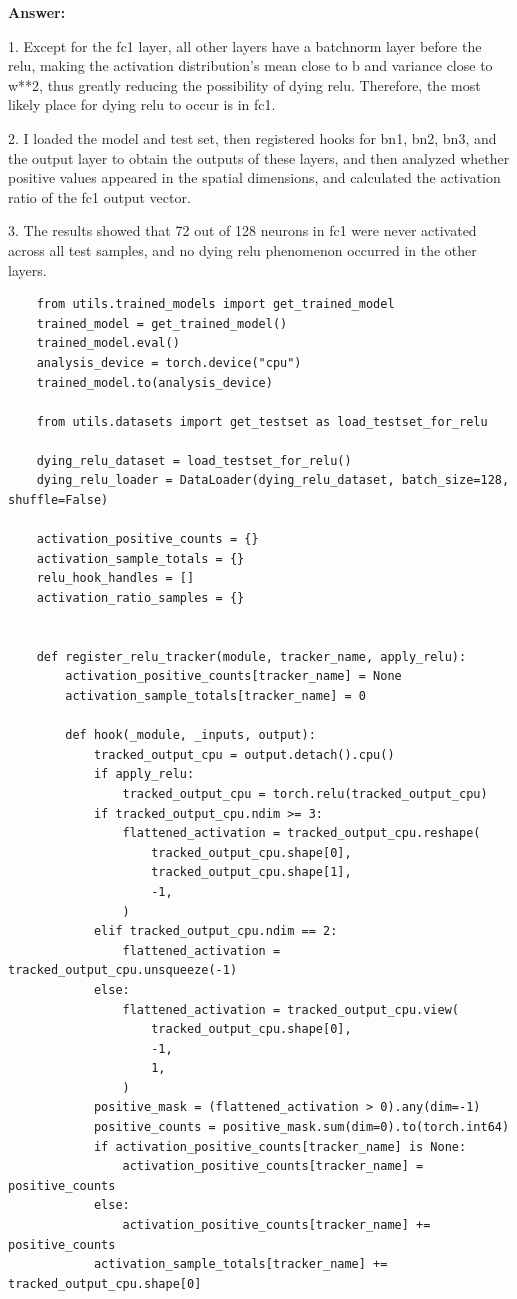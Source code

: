 \documentclass[11pt, oneside]{article}   	%
\begin{document}
\begin{answerbox} \textbf{Answer:} \vspace*{1cm}

1. Except for the fc1 layer, all other layers have a batchnorm layer before the relu, making the activation distribution's mean close to b and variance close to w**2, thus greatly reducing the possibility of dying relu. Therefore, the most likely place for dying relu to occur is in fc1.

2. I loaded the model and test set, then registered hooks for bn1, bn2, bn3, and the output layer to obtain the outputs of these layers, and then analyzed whether positive values appeared in the spatial dimensions, and calculated the activation ratio of the fc1 output vector.

3. The results showed that 72 out of 128 neurons in fc1 were never activated across all test samples, and no dying relu phenomenon occurred in the other layers.

\begin{verbatim}
    from utils.trained_models import get_trained_model
    trained_model = get_trained_model()
    trained_model.eval()
    analysis_device = torch.device("cpu")
    trained_model.to(analysis_device)
    
    from utils.datasets import get_testset as load_testset_for_relu
    
    dying_relu_dataset = load_testset_for_relu()
    dying_relu_loader = DataLoader(dying_relu_dataset, batch_size=128, shuffle=False)
    
    activation_positive_counts = {}
    activation_sample_totals = {}
    relu_hook_handles = []
    activation_ratio_samples = {}
    
    
    def register_relu_tracker(module, tracker_name, apply_relu):
        activation_positive_counts[tracker_name] = None
        activation_sample_totals[tracker_name] = 0
    
        def hook(_module, _inputs, output):
            tracked_output_cpu = output.detach().cpu()
            if apply_relu:
                tracked_output_cpu = torch.relu(tracked_output_cpu)
            if tracked_output_cpu.ndim >= 3:
                flattened_activation = tracked_output_cpu.reshape(
                    tracked_output_cpu.shape[0],
                    tracked_output_cpu.shape[1],
                    -1,
                )
            elif tracked_output_cpu.ndim == 2:
                flattened_activation = tracked_output_cpu.unsqueeze(-1)
            else:
                flattened_activation = tracked_output_cpu.view(
                    tracked_output_cpu.shape[0],
                    -1,
                    1,
                )
            positive_mask = (flattened_activation > 0).any(dim=-1)
            positive_counts = positive_mask.sum(dim=0).to(torch.int64)
            if activation_positive_counts[tracker_name] is None:
                activation_positive_counts[tracker_name] = positive_counts
            else:
                activation_positive_counts[tracker_name] += positive_counts
            activation_sample_totals[tracker_name] += tracked_output_cpu.shape[0]
    

\end{verbatim}
\end{answerbox}
\end{document}
